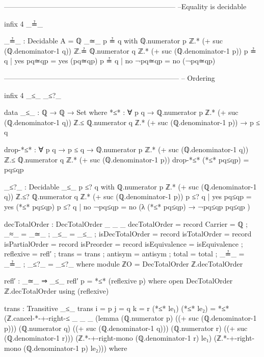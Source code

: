 \documentclass[11pt,a4paper]{article}
\begin{document}
\begin{code}
------------------------------------------------------------------------
--Equality is decidable

infix 4 _≟_

_≟_ : Decidable {A = ℚ} _≃_
p ≟ q with ℚ.numerator p ℤ.* (+ suc (ℚ.denominator-1 q)) ℤ.≟
            ℚ.numerator q ℤ.* (+ suc (ℚ.denominator-1 p))
p ≟ q | yes pq≃qp = yes (pq≃qp)
p ≟ q | no ¬pq≃qp = no (¬pq≃qp)

--------------------------------------------------------------------------
 -- Ordering

infix 4 _≤_ _≤?_

data _≤_ : ℚ → ℚ → Set where
  *≤* : ∀ {p q} →
        ℚ.numerator p ℤ.* (+ suc (ℚ.denominator-1 q)) ℤ.≤
        ℚ.numerator q ℤ.* (+ suc (ℚ.denominator-1 p)) →
        p ≤ q

drop-*≤* : ∀ {p q} → p ≤ q →
           ℚ.numerator p ℤ.* (+ suc (ℚ.denominator-1 q)) ℤ.≤
           ℚ.numerator q ℤ.* (+ suc (ℚ.denominator-1 p))
drop-*≤* (*≤* pq≤qp) = pq≤qp

_≤?_ : Decidable _≤_
p ≤? q with ℚ.numerator p ℤ.* (+ suc (ℚ.denominator-1 q)) ℤ.≤?
            ℚ.numerator q ℤ.* (+ suc (ℚ.denominator-1 p))
p ≤? q | yes pq≤qp = yes (*≤* pq≤qp)
p ≤? q | no ¬pq≤qp = no (λ { (*≤* pq≤qp) → ¬pq≤qp pq≤qp })

decTotalOrder : DecTotalOrder _ _ _
decTotalOrder = record
  { Carrier         = ℚ
  ; _≈_             = _≃_
  ; _≤_             = _≤_
  ; isDecTotalOrder = record
      { isTotalOrder = record
          { isPartialOrder = record
              { isPreorder = record
                  { isEquivalence = isEquivalence
                  ; reflexive     = refl′
                  ; trans         = trans
                  }
                ; antisym = antisym
              }
          ; total = total
          }
      ; _≟_  = _≟_
      ; _≤?_ = _≤?_
      }
  }
  where
  module ℤO = DecTotalOrder ℤ.decTotalOrder

  refl′ : _≃_ ⇒ _≤_
  refl′ p = *≤* (reflexive p)
    where
      open DecTotalOrder ℤ.decTotalOrder using (reflexive)

  trans : Transitive _≤_
  trans {i = p} {j = q} {k = r} (*≤* le₁) (*≤* le₂)
    = *≤* (ℤ.cancel-*-+-right-≤ _ _ _
            (lemma
              (ℚ.numerator p) ((+ suc (ℚ.denominator-1 p)))
              (ℚ.numerator q) ((+ suc (ℚ.denominator-1 q)))
              (ℚ.numerator r) ((+ suc (ℚ.denominator-1 r)))
              (ℤ.*-+-right-mono (ℚ.denominator-1 r) le₁)
              (ℤ.*-+-right-mono (ℚ.denominator-1 p) le₂)))
    where


\end{code}
\end{document}
